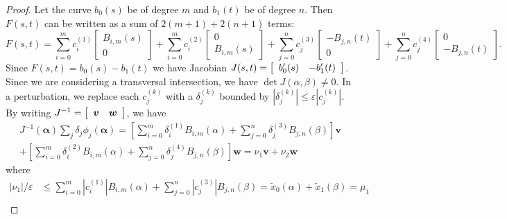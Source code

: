 \documentclass[3p, authoryear, square]{elsarticle}
\theoremstyle{definition}
\newcommand{\eps}{\varepsilon}
\begin{document}
\begin{proof}
Let the curve \(b_0(s)\) be of degree \(m\) and \(b_1(t)\) be of degree \(n\).
Then \(F(s, t)\) can be written as a sum of \(2(m + 1) + 2(n + 1)\) terms:
\begin{equation}\label{eq:bezier-full-basis}
F(s, t) =
  \sum_{i = 0}^m c_i^{(1)} \left[ \begin{array}{c}
  B_{i, m}(s) \\ 0 \end{array}\right] +
  \sum_{i = 0}^m c_i^{(2)} \left[ \begin{array}{c}
  0 \\ B_{i, m}(s) \end{array}\right] +
  \sum_{j = 0}^n c_j^{(3)} \left[ \begin{array}{c}
  -B_{j, n}(t) \\ 0 \end{array}\right] +
  \sum_{j = 0}^n c_j^{(4)} \left[ \begin{array}{c}
  0 \\ -B_{j, n}(t) \end{array}\right].
\end{equation}
Since \(F(s, t) = b_0(s) - b_1(t)\) we have Jacobian \(J(s, t) =
\left[ \begin{array}{c c} b_0'(s) & -b_1'(t) \end{array}\right]\). Since we
are considering a transversal intersection, we have
\(\det J(\alpha, \beta) \neq 0\). In a perturbation, we replace each
\(c_j^{(k)}\) with a \(\delta_j^{(k)}\) bounded by
\(\left|\delta_j^{(k)}\right| \leq \eps \left|c_j^{(k)}\right|\).
By writing \(J^{-1} = \left[ \begin{array}{c c}
\bm{v} & \bm{w} \end{array}\right]\), we have
\begin{multline}
J^{-1}\left(\bm{\alpha}\right) \sum_j \delta_j
  \phi_j\left(\bm{\alpha}\right) =
  \left[\sum_{i = 0}^m \delta_i^{(1)} B_{i, m}(\alpha) +
  \sum_{j = 0}^n \delta_j^{(3)} B_{j, n}(\beta)\right] \bm{v} \\
  + \left[\sum_{i = 0}^m \delta_i^{(2)} B_{i, m}(\alpha) +
  \sum_{j = 0}^n \delta_j^{(4)} B_{j, n}(\beta)\right] \bm{w} =
  \nu_1 \bm{v} + \nu_2 \bm{w}
\end{multline}
where
\begin{align}
\left|\nu_1\right| / \eps &\leq \sum_{i = 0}^m
  \left|c_{i}^{(1)}\right| B_{i, m}\left(\alpha\right) + \sum_{j = 0}^n
  \left|c_{j}^{(3)}\right| B_{j, n}\left(\beta\right) =
  \widetilde{x}_0(\alpha) + \widetilde{x}_1(\beta) = \mu_1 \\

\end{align}
\end{proof}
\end{document}
